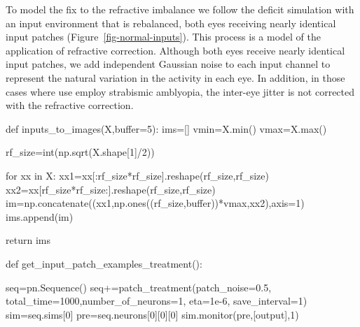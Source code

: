 \documentclass[
  letterpaper,
  DIV=11,
  numbers=noendperiod]{scrreprt}
\newenvironment{Shaded}{\begin{snugshade}}{\end{snugshade}}
\newcommand{\BuiltInTok}[1]{\textcolor[rgb]{0.00,0.23,0.31}{#1}}
\newcommand{\ControlFlowTok}[1]{\textcolor[rgb]{0.00,0.23,0.31}{#1}}
\newcommand{\DecValTok}[1]{\textcolor[rgb]{0.68,0.00,0.00}{#1}}
\newcommand{\FloatTok}[1]{\textcolor[rgb]{0.68,0.00,0.00}{#1}}
\newcommand{\KeywordTok}[1]{\textcolor[rgb]{0.00,0.23,0.31}{#1}}
\newcommand{\NormalTok}[1]{\textcolor[rgb]{0.00,0.23,0.31}{#1}}
\newcommand{\OperatorTok}[1]{\textcolor[rgb]{0.37,0.37,0.37}{#1}}
\newcommand{\StringTok}[1]{\textcolor[rgb]{0.13,0.47,0.30}{#1}}
\begin{document}
To model the fix to the refractive imbalance we follow the deficit
simulation with an input environment that is rebalanced, both eyes
receiving nearly identical input patches
(Figure~\ref{fig-normal-inputs}). This process is a model of the
application of refractive correction. Although both eyes receive nearly
identical input patches, we add independent Gaussian noise to each input
channel to represent the natural variation in the activity in each eye.
In addition, in those cases where use employ strabismic amblyopia, the
inter-eye jitter is not corrected with the refractive correction.

\begin{Shaded}
\begin{Highlighting}[]
\KeywordTok{def}\NormalTok{ inputs\_to\_images(X,}\BuiltInTok{buffer}\OperatorTok{=}\DecValTok{5}\NormalTok{):}
\NormalTok{    ims}\OperatorTok{=}\NormalTok{[]}
\NormalTok{    vmin}\OperatorTok{=}\NormalTok{X.}\BuiltInTok{min}\NormalTok{()}
\NormalTok{    vmax}\OperatorTok{=}\NormalTok{X.}\BuiltInTok{max}\NormalTok{()}
    
\NormalTok{    rf\_size}\OperatorTok{=}\BuiltInTok{int}\NormalTok{(np.sqrt(X.shape[}\DecValTok{1}\NormalTok{]}\OperatorTok{/}\DecValTok{2}\NormalTok{))}
    
    \ControlFlowTok{for}\NormalTok{ xx }\KeywordTok{in}\NormalTok{ X:}
\NormalTok{        xx1}\OperatorTok{=}\NormalTok{xx[:rf\_size}\OperatorTok{*}\NormalTok{rf\_size].reshape(rf\_size,rf\_size)}
\NormalTok{        xx2}\OperatorTok{=}\NormalTok{xx[rf\_size}\OperatorTok{*}\NormalTok{rf\_size:].reshape(rf\_size,rf\_size)}
\NormalTok{        im}\OperatorTok{=}\NormalTok{np.concatenate((xx1,np.ones((rf\_size,}\BuiltInTok{buffer}\NormalTok{))}\OperatorTok{*}\NormalTok{vmax,xx2),axis}\OperatorTok{=}\DecValTok{1}\NormalTok{)   }
\NormalTok{        ims.append(im)}
        
    \ControlFlowTok{return}\NormalTok{ ims}

\KeywordTok{def}\NormalTok{ get\_input\_patch\_examples\_treatment():}
    
\NormalTok{    seq}\OperatorTok{=}\NormalTok{pn.Sequence()    }
\NormalTok{    seq}\OperatorTok{+=}\NormalTok{patch\_treatment(patch\_noise}\OperatorTok{=}\FloatTok{0.5}\NormalTok{,}
\NormalTok{               total\_time}\OperatorTok{=}\DecValTok{1000}\NormalTok{,number\_of\_neurons}\OperatorTok{=}\DecValTok{1}\NormalTok{,}
\NormalTok{               eta}\OperatorTok{=}\FloatTok{1e{-}6}\NormalTok{,}
\NormalTok{               save\_interval}\OperatorTok{=}\DecValTok{1}\NormalTok{)}
\NormalTok{    sim}\OperatorTok{=}\NormalTok{seq.sims[}\DecValTok{0}\NormalTok{]}
\NormalTok{    pre}\OperatorTok{=}\NormalTok{seq.neurons[}\DecValTok{0}\NormalTok{][}\DecValTok{0}\NormalTok{][}\DecValTok{0}\NormalTok{]}
\NormalTok{    sim.monitor(pre,[}\StringTok{\textquotesingle{}output\textquotesingle{}}\NormalTok{],}\DecValTok{1}\NormalTok{)}


\end{Highlighting}
\end{Shaded}
\end{document}
